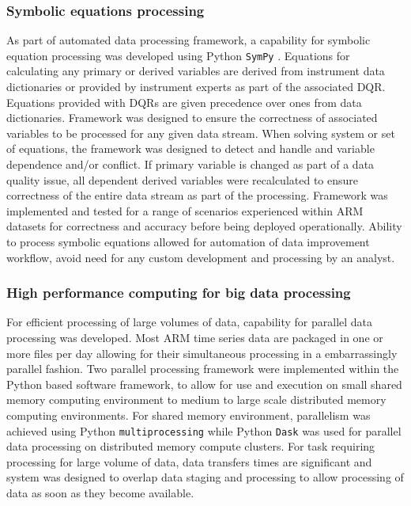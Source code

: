 \subsubsection{Symbolic equations processing}
As part of automated data processing framework, a capability for
symbolic equation processing was developed using Python \texttt{SymPy}
\cite{sympy}. Equations for calculating any primary or derived variables are
derived from instrument data dictionaries or provided by instrument
experts as part of the associated DQR. Equations provided with DQRs are
given precedence over ones from data dictionaries. Framework was
designed to ensure the correctness of associated variables to be
processed for any given data stream. When solving system or set of
equations, the framework was designed to detect and handle and variable
dependence and/or conflict. If primary variable is changed as part of
a data quality issue, all dependent derived variables were recalculated
to ensure correctness of the entire data stream as part of the processing.
Framework was implemented and tested for a range of scenarios experienced
within ARM datasets for correctness and accuracy before being deployed
operationally. Ability to process symbolic equations allowed for automation of data
improvement workflow, avoid need for any custom development and
processing by an analyst.

\subsubsection{High performance computing for big data processing}
For efficient processing of large volumes of data, capability for
parallel data processing was developed. Most ARM time series data are
packaged in one or more files per day allowing for their simultaneous
processing in a embarrassingly parallel fashion. Two parallel processing
framework were implemented within the Python based software framework,
to allow for use and execution on small shared memory computing
environment to medium to large scale distributed memory computing
environments. For shared memory environment, parallelism was achieved
using Python \texttt{multiprocessing} while Python \texttt{Dask}
\cite{dask} was used for parallel data processing on distributed memory
compute clusters. For task requiring processing for large volume of
data, data transfers times are significant and system was designed to
overlap data staging and processing to allow processing of data as soon
as they
become available.

